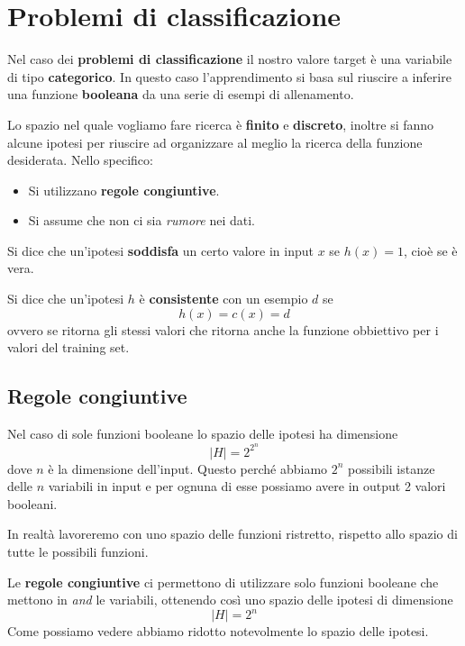 \chapter{Problemi di classificazione}
Nel caso dei \textbf{problemi di classificazione} il nostro valore target \`e una variabile di tipo \textbf{categorico}.
In questo caso l'apprendimento si basa sul riuscire a inferire una funzione \textbf{booleana} da una serie di
esempi di allenamento.

Lo spazio nel quale vogliamo fare ricerca \`e \textbf{finito} e \textbf{discreto}, inoltre si fanno alcune ipotesi per
riuscire ad organizzare al meglio la ricerca della funzione desiderata. Nello specifico:
\begin{itemize}
	\item Si utilizzano \textbf{regole congiuntive}.
	\item Si assume che non ci sia \emph{rumore} nei dati.
\end{itemize}

\begin{definition}
	Si dice che un'ipotesi \textbf{soddisfa} un certo valore in input $x$ se $h(x) = 1$, cio\`e se \`e vera.
\end{definition}

\begin{definition}\label{def: consistente}
	Si dice che un'ipotesi $h$ \`e \textbf{consistente} con un esempio $d$ se
	\[ h(x) = c(x) = d \]
	ovvero se ritorna gli stessi valori che ritorna anche la funzione obbiettivo per i valori del training set.
\end{definition}

\section{Regole congiuntive}
Nel caso di sole funzioni booleane lo spazio delle ipotesi ha dimensione
\[ |H| = 2^{2^n} \]
dove $n$ \`e la dimensione dell'input. Questo perch\'e abbiamo $2^n$ possibili istanze delle $n$ variabili in input e
per ognuna di esse possiamo avere in output 2 valori booleani.

In realt\`a lavoreremo con uno spazio delle funzioni ristretto, rispetto allo spazio di tutte le
possibili funzioni.

Le \textbf{regole congiuntive} ci permettono di utilizzare solo funzioni booleane che mettono in \emph{and} le
variabili, ottenendo cos\`i uno spazio delle ipotesi di dimensione
\[ |H| = 2^n \]
Come possiamo vedere abbiamo ridotto notevolmente lo spazio delle ipotesi.

